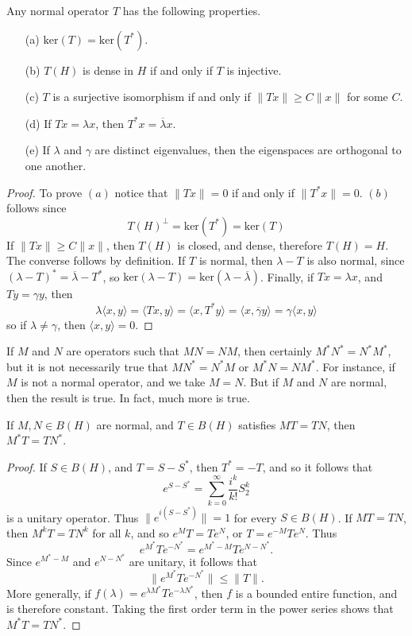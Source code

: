 \begin{theorem}
    Any normal operator $T$ has the following properties.
    \begin{enumerate}
        \item[(a)] $\text{ker}(T) = \text{ker}(T^*)$.
        \item[(b)] $T(H)$ is dense in $H$ if and only if $T$ is injective.
        \item[(c)] $T$ is a surjective isomorphism if and only if $\| Tx \| \geq C \| x \|$ for some $C$.
        \item[(d)] If $Tx = \lambda x$, then $T^*x = \overline{\lambda} x$.
        \item[(e)] If $\lambda$ and $\gamma$ are distinct eigenvalues, then the eigenspaces are orthogonal to one another.
    \end{enumerate}
\end{theorem}
\begin{proof}
    To prove $(a)$ notice that $\| Tx \| = 0$ if and only if $\| T^*x \| = 0$. $(b)$ follows since
    \[ T(H)^\perp = \text{ker}(T^*) = \text{ker}(T) \]
    If $\| Tx \| \geq C \| x \|$, then $T(H)$ is closed, and dense, therefore $T(H) = H$. The converse follows by definition. If $T$ is normal, then $\lambda - T$ is also normal, since $(\lambda - T)^* = \overline{\lambda} - T^*$, so $\text{ker}(\lambda - T) = \text{ker}(\lambda - \overline{\lambda})$. Finally, if $Tx = \lambda x$, and $Ty = \gamma y$, then
    \[ \lambda \langle x, y \rangle = \langle Tx, y \rangle = \langle x, T^*y \rangle = \langle x, \overline{\gamma} y \rangle = \gamma \langle x, y \rangle \]
    so if $\lambda \neq \gamma$, then $\langle x,y \rangle = 0$.
\end{proof}

If $M$ and $N$ are operators such that $MN = NM$, then certainly $M^*N^* = N^*M^*$, but it is not necessarily true that $MN^* = N^* M$ or $M^* N = N M^*$. For instance, if $M$ is not a normal operator, and we take $M = N$. But if $M$ and $N$ are normal, then the result is true. In fact, much more is true.

\begin{theorem}
    If $M,N \in B(H)$ are normal, and $T \in B(H)$ satisfies $MT = TN$, then $M^*T = TN^*$.
\end{theorem}
\begin{proof}
    If $S \in B(H)$, and $T = S - S^*$, then $T^* = -T$, and so it follows that
    \[ e^{S - S^*} = \sum_{k = 0}^\infty \frac{i^k}{k!} S_2^k \]
    is a unitary operator. Thus $\| e^{i(S - S^*)} \| = 1$ for every $S \in B(H)$. If $MT = TN$, then $M^k T = T N^k$ for all $k$, and so $e^M T = T e^N$, or $T = e^{-M} T e^N$. Thus
    \[ e^{M^*} T e^{-N^*} = e^{M^* - M} T e^{N-N^*}. \]
    Since $e^{M^* - M}$ and $e^{N - N^*}$ are unitary, it follows that
    \[ \| e^{M^*} T e^{-N^*} \| \leq \| T \|. \]
    More generally, if $f(\lambda) = e^{\lambda M^*} T e^{- \lambda N^*}$, then $f$ is a bounded entire function, and is therefore constant. Taking the first order term in the power series shows that $M^* T = TN^*$.
\end{proof}

